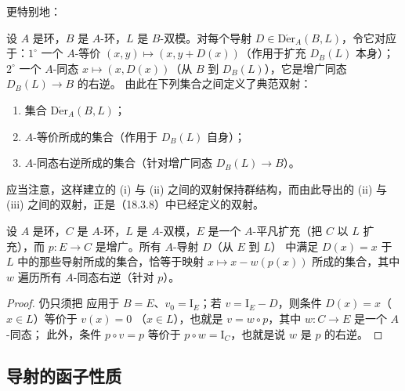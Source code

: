 更特别地：

\begin{corollary}[20.1.6]
\label{0.20.1.6-fr}
设 $A$ 是环，$B$ 是 $A$-环，$L$ 是 $B$-双模。对每个导射
$D\in\operatorname{D\acute{e}r}_A(B,L)$，令它对应于：$1^\circ$ 一个
$A$-等价 $(x,y)\mapsto(x,y+D(x))$（作用于扩充 $D_B(L)$ 本身）；$2^\circ$ 一个
$A$-同态 $x\mapsto(x,D(x))$（从 $B$ 到 $D_B(L)$），它是增广同态
$D_B(L)\to B$ 的右逆。
由此在下列集合之间定义了典范双射：
\begin{enumerate}
  \item[\rm(i)] 集合 $\operatorname{D\acute{e}r}_A(B,L)$；
  \item[\rm(ii)] $A$-等价所成的集合（作用于 $D_B(L)$ 自身）；
  \item[\rm(iii)] $A$-同态右逆所成的集合（针对增广同态 $D_B(L)\to B$）。
\end{enumerate}
\end{corollary}

应当注意，这样建立的 (i) 与 (ii) 之间的双射保持群结构，而由此导出的 (ii) 与
(iii) 之间的双射，正是（18.3.8）中已经定义的双射。

\begin{corollary}[20.1.7]
\label{0.20.1.7-fr}
设 $A$ 是环，$C$ 是 $A$-环，$L$ 是 $A$-双模，$E$ 是一个 $A$-平凡扩充（把
$C$ 以 $L$ 扩充），而 $p:E\to C$ 是增广。所有 $A$-导射 $D$（从 $E$ 到 $L$）
中满足 $D(x)=x$ 于 $L$ 中的那些导射所成的集合，恰等于映射
$x\mapsto x-w(p(x))$ 所成的集合，其中 $w$ 遍历所有 $A$-同态右逆（针对 $p$）。
\end{corollary}

\begin{proof}
仍只须把  应用于 $B=E$、$v_0=\mathrm{I}_E$；若
$v=\mathrm{I}_E-D$，则条件 $D(x)=x$（$x\in L$）等价于 $v(x)=0$
（$x\in L$），也就是 $v=w\circ p$，其中 $w:C\to E$ 是一个 $A$-同态；
此外，条件 $p\circ v=p$
等价于 $p\circ w=\mathrm{I}_C$，也就是说 $w$ 是 $p$ 的右逆。
\end{proof}

\subsection{导射的函子性质}
\label{subsection:0.20.2-fr}

